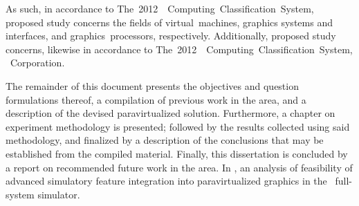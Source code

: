 As such, in accordance to The~2012~\dvttermacm ~Computing~Classification~System, proposed study concerns the fields of virtual~machines, graphics systems and interfaces,  and graphics~processors, respectively. Additionally, proposed study concerns, likewise in accordance to The~2012~\dvttermacm ~Computing~Classification~System, \dvttermintel ~Corporation.

The remainder of this document presents the objectives and question formulations thereof, a compilation of previous work in the area, and a description of the devised paravirtualized solution.
Furthermore, a chapter on experiment methodology is presented; followed by the results collected using said methodology, and finalized by a description of the conclusions that may be established from the compiled material.
Finally, this dissertation is concluded by a report on recommended future work in the area.
In , an analysis of feasibility of advanced simulatory feature integration into paravirtualized graphics in the \dvttermsimics\ full-system simulator.
